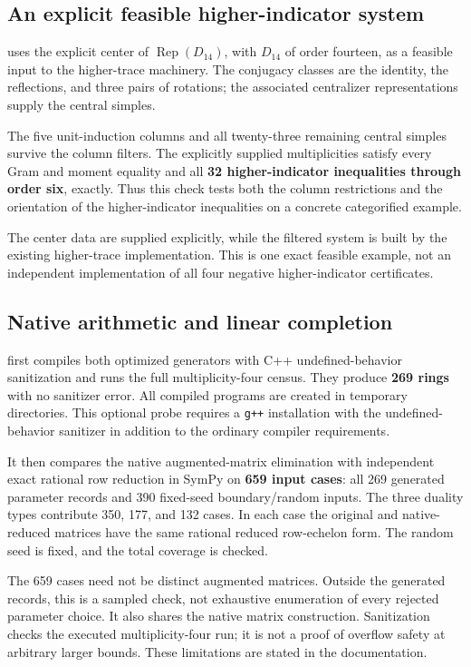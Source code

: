 \documentclass[11pt,a4paper]{article}
\begin{document}
\subsection{An explicit feasible higher-indicator system}

 uses the explicit center of
$\operatorname{Rep}(D_{14})$, with $D_{14}$ of order fourteen, as a
feasible input to the higher-trace machinery. The conjugacy classes
are the identity, the reflections, and three pairs of rotations;
the associated centralizer representations supply the central simples.

The five unit-induction columns and all twenty-three remaining central
simples survive the column filters. The explicitly supplied
multiplicities satisfy every Gram and moment equality and all
\textbf{32 higher-indicator inequalities through order six}, exactly.
Thus this check tests both the column restrictions and the orientation
of the higher-indicator inequalities on a concrete categorified example.

The center data are supplied explicitly, while the filtered system is
built by the existing higher-trace implementation. This is one exact
feasible example, not an independent implementation of all four
negative higher-indicator certificates.

\subsection{Native arithmetic and linear completion}

 first compiles both optimized
generators with C++ undefined-behavior sanitization and runs the full
multiplicity-four census. They produce \textbf{269 rings} with no
sanitizer error. All compiled programs are created in temporary
directories. This optional probe requires a \texttt{g++} installation
with the undefined-behavior sanitizer in addition to the ordinary
compiler requirements.

It then compares the native augmented-matrix elimination with
independent exact rational row reduction in SymPy on
\textbf{659 input cases}: all 269 generated parameter records and
390 fixed-seed boundary/random inputs. The three duality types
contribute 350, 177, and 132 cases. In each case the original and
native-reduced matrices have the same rational reduced row-echelon
form. The random seed is fixed, and the total coverage is checked.

The 659 cases need not be distinct augmented matrices. Outside the
generated records, this is a sampled check, not exhaustive enumeration
of every rejected parameter choice. It also shares the native matrix
construction. Sanitization checks the executed multiplicity-four run;
it is not a proof of overflow safety at arbitrary larger bounds.
These limitations are stated in the documentation.
\end{document}
